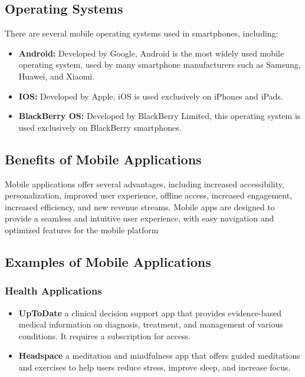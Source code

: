 \subsection{Operating Systems}
There are several mobile operating systems used in smartphones, including:

\begin{itemize}
\item \textbf{Android:}  Developed by Google, Android is the most widely used mobile operating system, used by many smartphone manufacturers such as Samsung, Huawei, and Xiaomi.
\item \textbf{IOS:} Developed by Apple, iOS is used exclusively on iPhones and iPads.
\item \textbf{BlackBerry OS:}  Developed by BlackBerry Limited, this operating system is used exclusively on BlackBerry smartphones.
\end{itemize}

\subsection{Benefits of Mobile Applications}
Mobile applications offer several advantages, including increased accessibility, personalization, improved user experience, offline access, increased engagement, increased efficiency, and new revenue streams. Mobile apps are designed to provide a seamless and intuitive user experience, with easy navigation and optimized features for the mobile platform

\subsection{Examples of Mobile Applications}

\subsubsection{Health Applications}

\begin{itemize}
\item \textbf{UpToDate} a clinical decision support app that provides evidence-based medical information on diagnosis, treatment, and management of various conditions. It requires a subscription for access.\cite{uptodate}
\item \textbf{Headspace} a meditation and mindfulness app that offers guided meditations and exercises to help users reduce stress, improve sleep, and increase focus.\cite{headspace}
\end{itemize}
